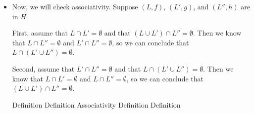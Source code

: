 \begin{itemize}
\item Now, we will check associativity. Suppose $(L,f)$, $(L',g)$, and $(L'',h)$ are in $H$. 

  First, assume that $L \cap L' = \emptyset$ and that $(L \cup L') \cap L'' = \emptyset$. 
  Then we know that $L \cap L'' = \emptyset$ and $L' \cap L'' = \emptyset$, so we can 
  conclude that $L \cap (L' \cup L'') = \emptyset$. 

  Second, assume that $L' \cap L'' = \emptyset$ and that $L \cap (L' \cup L'') = \emptyset$. 
  Then we know that $L \cap L' = \emptyset$ and $L \cap L'' = \emptyset$, so we can 
  conclude that $(L \cup L') \cap L'' = \emptyset$. 

  \begin{eqnproof}
          {Definition}
           {Definition}
           {Associativity}
            {Definition}
          {Definition}
  \end{eqnproof}
\end{itemize}
